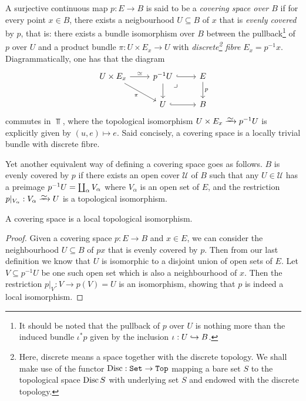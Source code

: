 \begin{definition}
\label{def:covering-space}
A surjective continuous map \(p: E \to B\) is said to be a \emph{covering space
  over \(B\)} if for every point \(x \in B\), there exists a neigbourhood
\(U \subseteq B\) of \(x\) that is \emph{evenly covered} by \(p\), that is:
there exists a bundle isomorphism over \(B\) between the pullback\footnote{It
  should be noted that the pullback of \(p\) over \(U\) is nothing more than the
  induced bundle \(\iota^{*} p\) given by the inclusion \(\iota: U \hookrightarrow B\).} of
\(p\) over \(U\) and a product bundle \(\pi: U \times E_x \to U\) with
\emph{discrete\footnote{Here, discrete means a space together with the discrete
    topology. We shall make use of the functor \(\operatorname{Disc}: {\texttt{Set}} \to {\texttt{Top}}\) mapping
    a bare set \(S\) to the topological space \(\operatorname{Disc} S\) with underlying set
    \(S\) and endowed with the discrete topology.} fibre}
\(E_x = p^{-1} x\). Diagrammatically, one has that the diagram
\[
\begin{tikzcd}
U \times E_x \ar[r, "\dis"] \ar[rd, "\pi"']
&p^{-1} U \ar[r, hook] \ar[d]
\ar[rd, "\lrcorner", phantom, very near start]
&E \ar[d, "p"] \\
&U \ar[r, hook] &B
\end{tikzcd}
\]
commutes in \(\Top\), where the topological isomorphism
\(U \times E_x \isoto p^{-1} U\) is explicitly given by \((u, e) \mapsto
e\). Said concisely, a covering space is a locally trivial bundle with discrete
fibre.

Yet another equivalent way of defining a covering space goes as follows. \(B\) is
evenly covered by \(p\) if there exists an open cover \(\mathcal{U}\) of \(B\)
such that any \(U \in \mathcal{U}\) has a preimage \(p^{-1} U = \coprod_{\alpha}
V_{\alpha}\) where \(V_{\alpha}\) is an open set of \(E\), and the restriction
\(p|_{V_{\alpha}}: V_{\alpha} \isoto U\) is a topological isomorphism.
\end{definition}

\begin{corollary}
\label{cor:covering-space-is-locally-top-iso}
A covering space is a local topological isomorphism.
\end{corollary}

\begin{proof}
Given a covering space \(p: E \to B\) and \(x \in E\), we can consider the
neighbourhood \(U \subseteq B\) of \(p x\) that is evenly covered by \(p\). Then
from our last definition we know that \(U\) is isomorphic to a disjoint union of
open sets of \(E\). Let \(V \subseteq p^{-1} U\) be one such open set which is
also a neighbourhood of \(x\). Then the restriction \(p|_V: V \to p(V) = U\) is
an isomorphism, showing that \(p\) is indeed a local isomorphism.
\end{proof}

